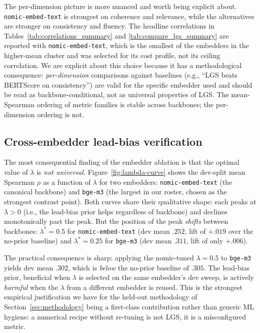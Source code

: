 \documentclass[journal]{IEEEtran}
\begin{document}
The per-dimension picture is more nuanced and worth being
explicit about. \texttt{nomic-embed-text} is strongest on
coherence and relevance, while the alternatives are stronger on
consistency and fluency. The headline correlations in
Tables~\ref{tab:correlations_summary} and
\ref{tab:compare_lgs_summary} are reported with
\texttt{nomic-embed-text}, which is the smallest of the embedders
in the higher-mean cluster and was selected for its cost profile,
not its ceiling correlation. We are explicit about this choice
because it has a methodological consequence:
\emph{per-dimension} comparisons against baselines (e.g., ``LGS
beats BERTScore on consistency'') are valid for the specific
embedder used and should be read as backbone-conditional, not as
universal properties of LGS. The mean-Spearman ordering of
metric families is stable across backbones; the per-dimension
ordering is not.



\subsection{Cross-embedder lead-bias verification}
\label{sec:ablation-lead-bge}
The most consequential finding of the embedder ablation is that
the optimal value of $\lambda$ is \emph{not universal}.
Figure~\ref{fig:lambda-curve} shows the dev-split mean Spearman
$\rho$ as a function of $\lambda$ for two embedders:
\texttt{nomic-embed-text} (the canonical backbone) and
\texttt{bge-m3} (the largest in our roster, chosen as the
strongest contrast point). Both curves share their qualitative
shape: each peaks at $\lambda{>}0$ (i.e., the lead-bias prior
helps regardless of backbone) and declines monotonically past the
peak. But the position of the peak \emph{shifts} between
backbones: $\lambda^{*}{=}0.5$ for \texttt{nomic-embed-text}
(dev mean $.252$, lift of $+.019$ over the no-prior baseline) and
$\lambda^{*}{=}0.25$ for \texttt{bge-m3} (dev mean $.311$, lift
of only $+.006$).

The practical consequence is sharp: applying the nomic-tuned
$\lambda{=}0.5$ to \texttt{bge-m3} yields dev mean $.302$, which
is \emph{below} the no-prior baseline of $.305$. The lead-bias
prior, beneficial when $\lambda$ is selected on the same
embedder's dev sweep, is actively \emph{harmful} when the
$\lambda$ from a different embedder is reused. This is the
strongest empirical justification we have for the held-out
methodology of Section~\ref{sec:methodology} being a first-class
contribution rather than generic ML hygiene: a numerical recipe
without re-tuning is not LGS, it is a misconfigured metric.
\end{document}
